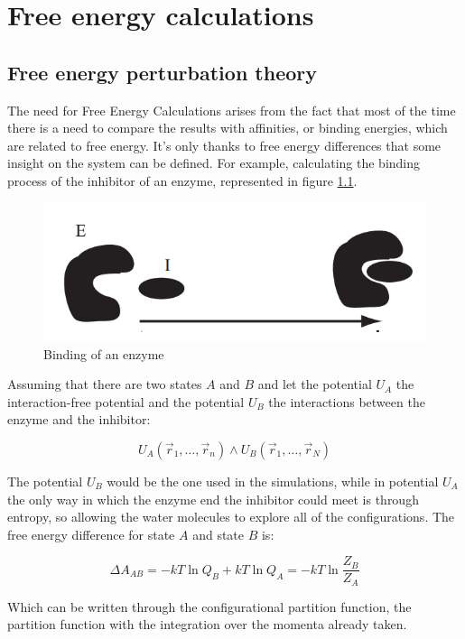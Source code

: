 \graphicspath{{chapters/18/images/}}
\chapter{Free energy calculations}

\section{Free energy perturbation theory}
The need for Free Energy Calculations arises from the fact that most of the time there is a need to compare the results with affinities, or binding energies, which are related to free energy.
It's only thanks to free energy differences that some insight on the system can be defined.
For example, calculating the binding process of the inhibitor of an enzyme, represented in figure \ref{fig:enzymes}.

\begin{figure}[H]
	\centering
	\includegraphics[scale=0.4]{enzymes.png}
	\caption{Binding of an enzyme}
	\label{fig:enzymes}
\end{figure}

Assuming that there are two states $A$ and $B$ and let the potential $U_A$ the interaction-free potential and the potential $U_B$ the interactions between the enzyme and the inhibitor:

$$U_A(\vec{r}_1, \dots, \vec{r}_n)\land U_{B}(\vec{r}_1, \dots, \vec{r}_N)$$

The potential $U_B$ would be the one used in the simulations, while in potential $U_A$ the only way in which the enzyme end the inhibitor could meet is through entropy, so allowing the water molecules to explore all of the configurations.
The free energy difference for state $A$ and state $B$ is:

$$\Delta A_{AB} = -kT\ln Q_B + kT\ln Q_A = -kT\ln\frac{Z_B}{Z_A}$$

Which can be written through the configurational partition function, the partition function with the integration over the momenta already taken.

